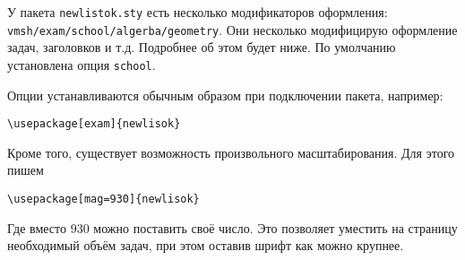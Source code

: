 \documentclass[10pt]{article}
\begin{document}
У пакета \texttt{newlistok.sty} есть несколько модификаторов оформления: \verb'vmsh/exam/school/algerba/geometry'.
Они несколько модифицирую оформление задач, заголовков и т.д.
Подробнее об этом будет ниже.
По умолчанию установлена опция \texttt{school}.



Опции устанавливаются обычным образом при подключении пакета, например:
\begin{verbatim}
\usepackage[exam]{newlisok}
\end{verbatim}

Кроме того, существует возможность произвольного масштабирования. Для этого пишем
\begin{verbatim}
\usepackage[mag=930]{newlisok}
\end{verbatim}
Где вместо 930 можно поставить своё число.
Это позволяет уместить на страницу необходимый объём задач, при этом оставив шрифт как можно крупнее.


\newpage
\end{document}
